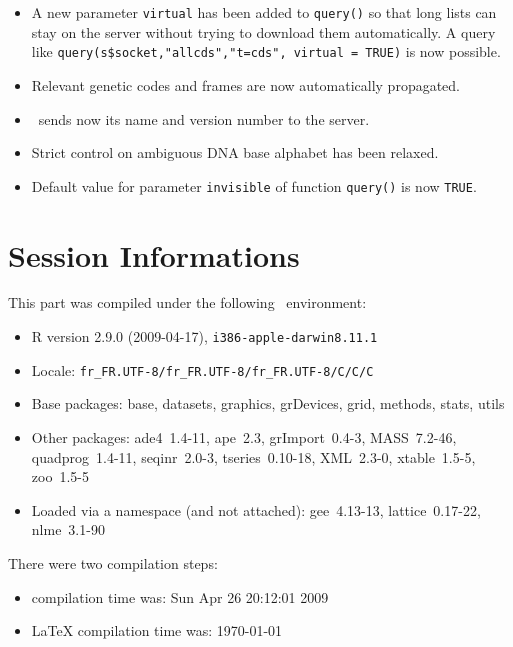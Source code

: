 \documentclass{article}
\begin{document}
\begin{itemize}
\item A new parameter \texttt{virtual} has been added to \texttt{query()} 
so that long lists can stay on the server without trying to download
them automatically. A query like \texttt{query(s\$socket,"allcds","t=cds", virtual = TRUE)} is 
now possible.

\item Relevant genetic codes and frames are now automatically propagated.

\item \Seqinr{}~sends now its name and version number to the server.

\item Strict control on ambiguous DNA base alphabet has been relaxed.

\item Default value for parameter \texttt{invisible} of function \texttt{query()} is now \texttt{TRUE}.

\end{itemize}



\section*{Session Informations}

\begin{scriptsize}

This part was compiled under the following \Rlogo{}~environment:

\begin{itemize}
  \item R version 2.9.0 (2009-04-17), \verb|i386-apple-darwin8.11.1|
  \item Locale: \verb|fr_FR.UTF-8/fr_FR.UTF-8/fr_FR.UTF-8/C/C/C|
  \item Base packages: base, datasets, graphics, grDevices, grid,
    methods, stats, utils
  \item Other packages: ade4~1.4-11, ape~2.3, grImport~0.4-3,
    MASS~7.2-46, quadprog~1.4-11, seqinr~2.0-3, tseries~0.10-18,
    XML~2.3-0, xtable~1.5-5, zoo~1.5-5
  \item Loaded via a namespace (and not attached): gee~4.13-13,
    lattice~0.17-22, nlme~3.1-90
\end{itemize}
There were two compilation steps:

\begin{itemize}
  \item \Rlogo{} compilation time was: Sun Apr 26 20:12:01 2009
  \item \LaTeX{} compilation time was: \today
\end{itemize}

\end{scriptsize}



\clearpage
{}


\end{document}
